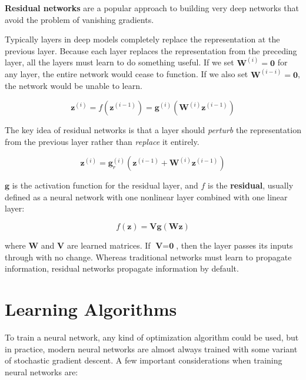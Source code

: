 \documentclass{article}
\begin{document}
\textbf{Residual networks} are a popular approach to building very deep networks
that avoid the problem of vanishing gradients.

Typically layers in deep models completely replace the representation at the previous
layer. Because each layer replaces the representation from the preceding layer, all
the layers must learn to do something useful. If we set $\textbf{W}^{(i)} = \textbf{0}$
for any layer, the entire network would cease to function. If we also set
$\textbf{W}^{(i-i)} = \textbf{0}$, the network would be unable to learn.

\[
\textbf{z}^{(i)} = f(\textbf{z}^{(i-1)}) = \textbf{g}^{(i)} (\textbf{W}^{(i)} \textbf{z}^{(i-1)})
\]

The key idea of residual networks is that a layer should {\em perturb} the representation
from the previous layer rather than {\em replace} it entirely.

\[
\textbf{z}^{(i)} = \textbf{g}_r^{(i)} (\textbf{z}^{(i-1)} + \textbf{W}^{(i)} \textbf{z}^{(i-1)})
\]

$\textbf{g}$ is the activation function for the residual layer, and $f$ is the \textbf{residual},
usually defined as a neural network with one nonlinear layer combined with one linear
layer:

\[
f(\textbf{z}) = \textbf{V} \textbf{g} ( \textbf{W} \textbf{z})
\]

where $\textbf{W}$ and $\textbf{V}$ are learned matrices. If $\textbf{V} = \textbf{0}$,
then the layer passes its inputs through with no change. Whereas traditional networks
must learn to propagate information, residual networks propagate information by default.

\section{Learning Algorithms}

To train a neural network, any kind of optimization algorithm could be used, but in
practice, modern neural networks are almost always trained with some variant of
stochastic gradient descent. A few important considerations when training neural
networks are:
\end{document}
